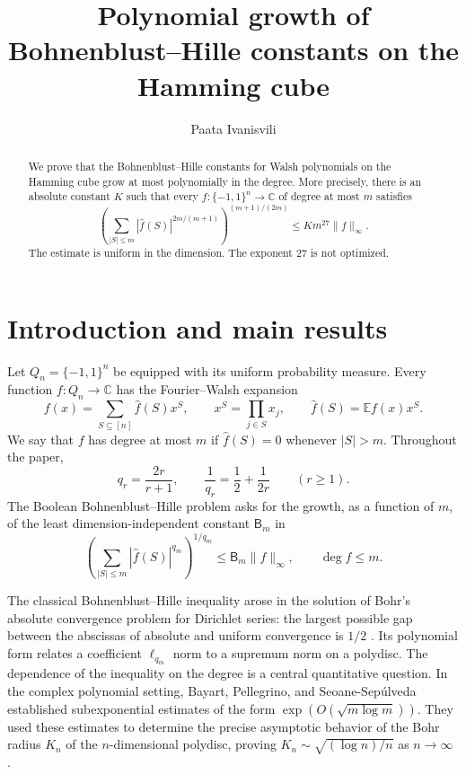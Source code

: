 \documentclass[11pt]{amsart}
\title[Polynomial Bohnenblust--Hille bounds on the cube]{Polynomial growth of Bohnenblust--Hille constants on the Hamming cube}
\author{Paata Ivanisvili}
\theoremstyle{remark}
\numberwithin{equation}{section}
\newcommand{\E}{\mathbb E}
\newcommand{\BH}{\mathsf B}
\begin{document}
\begin{abstract}
We prove that the Bohnenblust--Hille constants for Walsh polynomials on the
Hamming cube grow at most polynomially in the degree. More precisely, there
is an absolute constant $K$ such that every $f :\{-1,1\}^{n} \to \mathbb{C}$ of
degree at most $m$ satisfies
\[
\left(\sum_{|S|\le m}|\widehat f(S)|^{2m/(m+1)}\right)^{(m+1)/(2m)}
\le Km^{27}\|f\|_\infty.
\]
The estimate is uniform in the dimension. The exponent $27$ is not
optimized.
\end{abstract}
\maketitle

\section{Introduction and main results}

Let $Q_n=\{-1,1\}^n$ be equipped with its uniform probability measure.
Every function $f:Q_n\to\mathbb C$ has the Fourier--Walsh expansion
\[
f(x)=\sum_{S\subseteq[n]}\widehat f(S)x^S,
\qquad x^S=\prod_{j\in S}x_j,
\qquad \widehat f(S)=\E f(x)x^S.
\]
We say that $f$ has degree at most $m$ if $\widehat f(S)=0$ whenever
$|S|>m$. Throughout the paper,
\[
q_r=\frac{2r}{r+1},\qquad
\frac1{q_r}=\frac12+\frac1{2r}\qquad(r\ge1).
\]
The Boolean Bohnenblust--Hille problem asks for the growth, as a function
of $m$, of the least dimension-independent constant $\BH_m$ in
\begin{equation}\label{eq:BH-intro}
\left(\sum_{|S|\le m}|\widehat f(S)|^{q_m}\right)^{1/q_m}
\le\BH_m\|f\|_\infty,
\qquad \deg f\le m.
\end{equation}

The classical Bohnenblust--Hille inequality arose in the solution of
Bohr's absolute convergence problem for Dirichlet series: the largest
possible gap between the abscissas of absolute and uniform convergence
is $1/2$ \cite{BH31}. Its polynomial form relates a coefficient
$\ell_{q_m}$ norm to a supremum norm on a polydisc. The dependence of the
inequality on the degree is a central quantitative question. In the
complex polynomial setting, Bayart, Pellegrino, and Seoane-Sep\'ulveda
\cite{BPS14} established subexponential estimates of the form
$\exp(O(\sqrt{m\log m}))$. They used these estimates to determine the
precise asymptotic behavior of the Bohr radius $K_n$ of the
$n$-dimensional polydisc, proving $K_n\sim\sqrt{(\log n)/n}$ as
$n\to\infty$ \cite{BPS14}.
\end{document}
